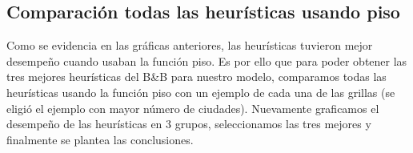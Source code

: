 \documentclass[10pt]{article}
\begin{document}



\newpage
\subsection{Comparación todas las heurísticas usando piso}
Como se evidencia en las gráficas anteriores, las heurísticas tuvieron mejor desempeño cuando usaban la función piso. Es por ello que para poder obtener las tres mejores heurísticas del
B\&B para nuestro modelo, comparamos todas las heurísticas usando la función piso con un ejemplo de cada una de las grillas (se eligió el ejemplo con mayor número de ciudades). Nuevamente
graficamos el desempeño de las heurísticas en 3 grupos, seleccionamos las tres mejores y finalmente se plantea las conclusiones.
\end{document}
